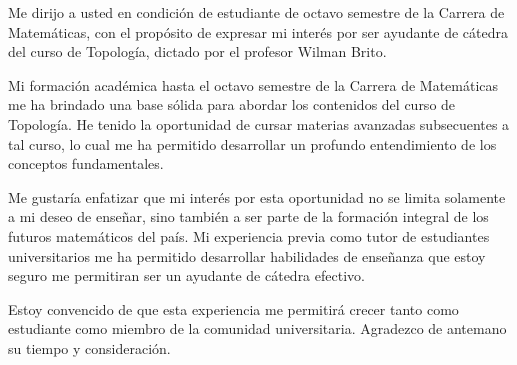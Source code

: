 \documentclass[11pt,a4paper,sans]{moderncv}        %
\begin{document}
Me dirijo a usted en condición de estudiante de octavo semestre de la Carrera de Matemáticas, con el propósito de expresar mi interés por ser ayudante de cátedra del curso de Topología, dictado por el profesor Wilman Brito.


Mi formación académica hasta el octavo semestre de la Carrera de Matemáticas me ha brindado una base sólida para abordar los contenidos del curso de Topología. He tenido la oportunidad de cursar materias avanzadas subsecuentes a tal curso, lo cual me ha permitido desarrollar un profundo entendimiento de los conceptos fundamentales.



Me gustaría enfatizar que mi interés por esta oportunidad no se limita solamente a mi deseo de enseñar, sino también a ser parte de la formación integral de los futuros matemáticos del país. Mi experiencia previa como tutor de estudiantes universitarios me ha permitido desarrollar habilidades de  enseñanza que estoy seguro me permitiran ser un ayudante de cátedra efectivo.


Estoy convencido de que esta experiencia me permitirá crecer tanto como estudiante como miembro de la comunidad universitaria.
Agradezco de antemano su tiempo y consideración.


~


\makeletterclosing

 
\end{document}
